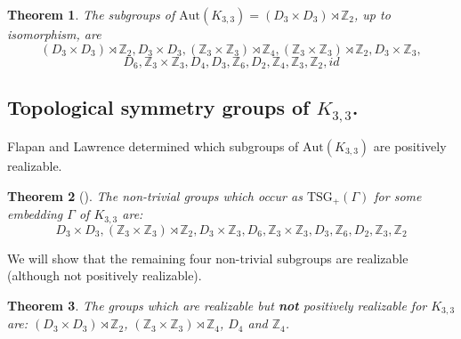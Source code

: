 \documentclass[11]{amsart}
\def\Z{\mathbb{Z}}
\newcommand{\semi}{{\rtimes}}
\def\TSG{{\mathrm{TSG}}}
\def\Aut{{\mathrm{Aut}}}
\newtheorem{theorem}{Theorem}[section]
\theoremstyle{definition}
\theoremstyle{remark}
\begin{document}
\begin{theorem}\label{T:K33subgroups}
The subgroups of $\Aut(K_{3,3}) = (D_3 \times D_3) \semi \Z_2$, up to isomorphism, are
$$(D_3 \times D_3) \semi \Z_2, D_3 \times D_3, (\Z_3 \times \Z_3) \semi \Z_4, (\Z_3\times \Z_3) \semi \Z_2, D_3 \times \Z_3,$$
$$D_6, \Z_3 \times \Z_3, D_4, D_3, \Z_6, D_2, \Z_4, \Z_3, \Z_2, id$$
\end{theorem}

\subsection{Topological symmetry groups of $K_{3,3}$.}

Flapan and Lawrence determined which subgroups of $\Aut(K_{3,3})$ are positively realizable.

\begin{theorem}[\cite{fl}] \label{T:K33TSG+}
The non-trivial groups which occur as $\TSG_+(\Gamma)$ for some embedding $\Gamma$ of $K_{3,3}$ are:
$$D_3 \times D_3, (\Z_3\times \Z_3) \semi \Z_2, D_3 \times \Z_3, D_6, \Z_3 \times \Z_3, D_3, \Z_6, D_2, \Z_3, \Z_2$$
\end{theorem}

We will show that the remaining four non-trivial subgroups are realizable (although not positively realizable). 

\begin{theorem} \label{T:K33TSG}
The groups which are realizable but {\bf not} positively realizable for $K_{3,3}$ are: $(D_3 \times D_3) \semi \Z_2$, $(\Z_3 \times \Z_3) \semi \Z_4$, $D_4$ and $\Z_4$.
\end{theorem}
\end{document}
